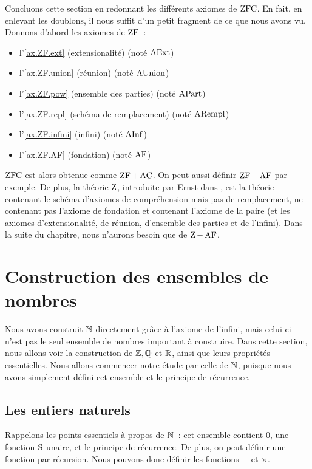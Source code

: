 Concluons cette section en redonnant les différents axiomes de $\operatorname{ZFC}$. En fait,
en enlevant les doublons, il nous suffit d'un petit fragment de ce que nous
avons vu. Donnons d'abord les axiomes de $\operatorname{ZF}$~:
\begin{itemize}
\item l'\cref{ax.ZF.ext} (extensionalité) (noté $\operatorname{AExt}$)
\item l'\cref{ax.ZF.union} (réunion) (noté $\operatorname{AUnion}$)
\item l'\cref{ax.ZF.pow} (ensemble des parties) (noté $\operatorname{APart}$)
\item l'\cref{ax.ZF.repl} (schéma de remplacement) (noté $\operatorname{ARempl}$)
\item l'\cref{ax.ZF.infini} (infini) (noté $\operatorname{AInf}$)
\item l'\cref{ax.ZF.AF} (fondation) (noté $\operatorname{AF}$)
\end{itemize}
$\operatorname{ZFC}$ est alors obtenue comme $\operatorname{ZF} + \operatorname{AC}$. On peut aussi définir
$\operatorname{ZF} - \operatorname{AF}$ par exemple. De plus, la théorie $\operatorname{Z}$, introduite par
Ernst  dans \cite{Zermelo1908}, est la
théorie contenant le schéma d'axiomes de compréhension mais pas de remplacement,
ne contenant pas l'axiome de fondation et contenant l'axiome de la paire (et les
axiomes d'extensionalité, de réunion, d'ensemble des parties et de l'infini).
Dans la suite du chapitre, nous n'aurons besoin que de $\operatorname{Z} - \operatorname{AF}$.

\section{Construction des ensembles de nombres}

Nous avons construit $\mathbb N$ directement grâce à l'axiome de l'infini, mais
celui-ci n'est pas le seul ensemble de nombres important à construire. Dans
cette section, nous allons voir la construction de $\mathbb Z, \mathbb Q$ et
$\mathbb R$, ainsi que leurs propriétés essentielles. Nous allons commencer
notre étude par celle de $\mathbb N$, puisque nous avons simplement défini cet
ensemble et le principe de récurrence.

\subsection{Les entiers naturels}

Rappelons les points essentiels à propos de $\mathbb N$~: cet ensemble contient
$0$, une fonction $\operatorname{S}$ unaire, et le principe de récurrence. De plus, on peut
définir une fonction par récursion. Nous pouvons donc définir les fonctions
$+$ et $\times$.

